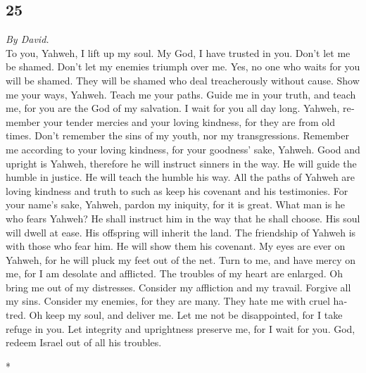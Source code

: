 \begin{paracol}{2}
\begin{otherlanguage}{english}
{\section{25}\label{section-49}}

\emph{By David.}\\
 To you, Yahweh, I lift up my soul.  My God,
I have trusted in you. Don't let me be shamed. Don't let my enemies
triumph over me.  Yes, no one who waits for you will be
shamed. They will be shamed who deal treacherously without cause.
 Show me your ways, Yahweh. Teach me your paths.
 Guide me in your truth, and teach me, for you are the God
of my salvation. I wait for you all day long.  Yahweh,
remember your tender mercies and your loving kindness, for they are from
old times.  Don't remember the sins of my youth, nor my
transgressions. Remember me according to your loving kindness, for your
goodness' sake, Yahweh.  Good and upright is Yahweh,
therefore he will instruct sinners in the way.  He will
guide the humble in justice. He will teach the humble his way.
 All the paths of Yahweh are loving kindness and truth to
such as keep his covenant and his testimonies.  For your
name's sake, Yahweh, pardon my iniquity, for it is great.
 What man is he who fears Yahweh? He shall instruct him
in the way that he shall choose.  His soul will dwell at
ease. His offspring will inherit the land.  The
friendship of Yahweh is with those who fear him. He will show them his
covenant.  My eyes are ever on Yahweh, for he will pluck
my feet out of the net.  Turn to me, and have mercy on
me, for I am desolate and afflicted.  The troubles of my
heart are enlarged. Oh bring me out of my distresses. 
Consider my affliction and my travail. Forgive all my sins.
 Consider my enemies, for they are many. They hate me
with cruel hatred.  Oh keep my soul, and deliver me. Let
me not be disappointed, for I take refuge in you.  Let
integrity and uprightness preserve me, for I wait for you.
 God, redeem Israel out of all his troubles.

\end{otherlanguage}

\switchcolumn[0]*

\hypertarget{un-piadoso-grito-de-auxilio-consciente-de-su-inocencia}{%
}
\end{paracol}
